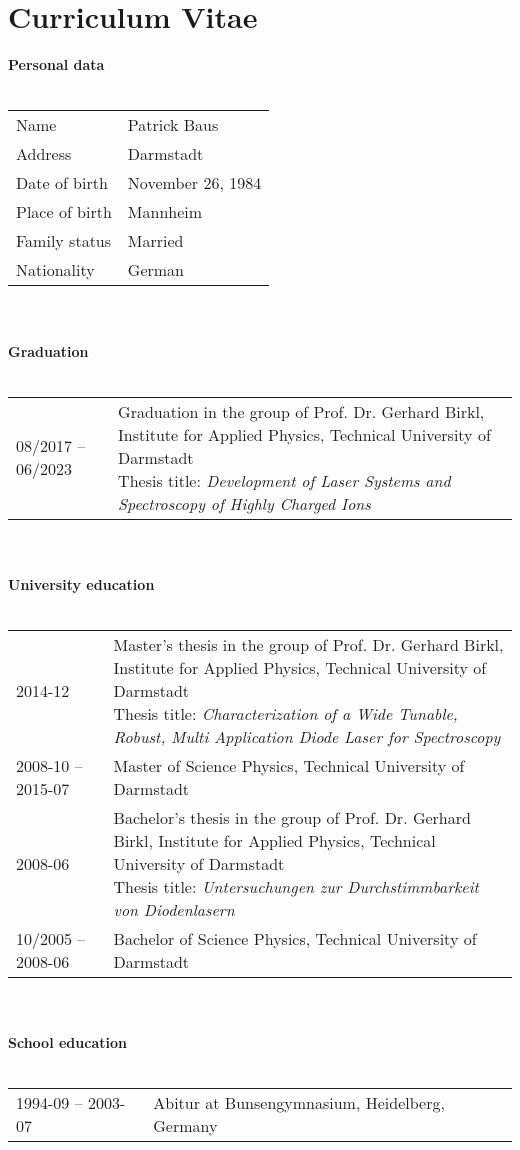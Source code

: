 \documentclass[12pt]{book}
\begin{document}
\chapter*{Curriculum Vitae}
\begingroup
\renewcommand{\arraystretch}{1.5}
{\Large \textbf{Personal data}}\\
\\%
\noindent%
\begin{tabular}{@{}ll}
Name & Patrick Baus \\
Address & Darmstadt \\
Date of birth & November 26, 1984 \\
Place of birth & Mannheim \\
Family status & Married \\
Nationality & German
\end{tabular}\\
\vspace{1cm}\\%
\noindent%
{\Large \textbf{Graduation}}\\
\\%
\noindent%
\begin{tabular}{@{}ll}
08/2017 -- 06/2023 & \parbox[t]{11cm}{Graduation in the group of Prof. Dr. Gerhard Birkl, Institute for Applied Physics, Technical University of Darmstadt \\
Thesis title: \textit{Development of Laser Systems and Spectroscopy of Highly Charged Ions} }
\end{tabular}\\
\vspace{1cm}\\%
\noindent%
{\Large \textbf{University education}}\\
\\%
\noindent%
\begin{tabular}{@{}ll}
    2014-12 & \parbox[t]{11cm}{Master's thesis in the group of Prof. Dr. Gerhard Birkl, Institute for Applied Physics, Technical University of Darmstadt \\
    Thesis title: \textit{Characterization of a Wide Tunable, Robust, Multi Application Diode Laser for Spectroscopy}}\\
    2008-10 -- 2015-07 & \parbox[t]{11cm}{Master of Science Physics, Technical University of Darmstadt}\\
    2008-06 & \parbox[t]{11cm}{Bachelor's thesis in the group of Prof. Dr. Gerhard Birkl, Institute for Applied Physics, Technical University of Darmstadt \\
    Thesis title: \textit{Untersuchungen zur Durchstimmbarkeit von Diodenlasern}} \\
    10/2005 -- 2008-06 & \parbox[t]{11cm}{Bachelor of Science Physics, Technical University of Darmstadt}
\end{tabular}\\
\vspace{1cm}\\%
\noindent%
{\Large \textbf{School education}}\\
\\%
\noindent%
\begin{tabular}{@{}ll}
1994-09 -- 2003-07 & Abitur at Bunsengymnasium, Heidelberg, Germany
\end{tabular}
\endgroup
\end{document}
